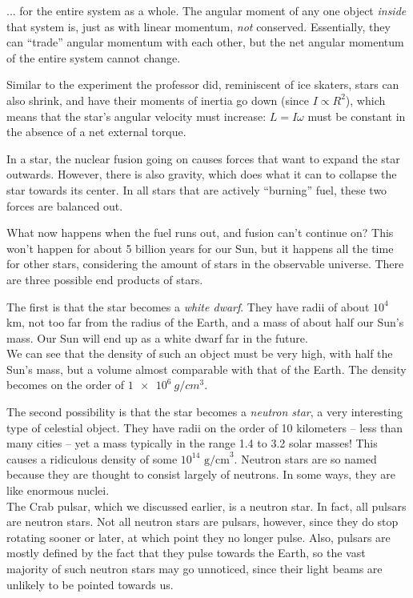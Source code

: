 \documentclass[8.01x]{subfiles}
\begin{document}
... for the entire system as a whole. The angular moment of any one object \emph{inside} that system is, just as with linear momentum, \emph{not} conserved. Essentially, they can ``trade'' angular momentum with each other, but the net angular momentum of the entire system cannot change.

Similar to the experiment the professor did, reminiscent of ice skaters, stars can also shrink, and have their moments of inertia go down (since $I \propto R^2$), which means that the star's angular velocity must increase: $L = I \omega$ must be constant in the absence of a net external torque.

In a star, 	the nuclear fusion going on causes forces that want to expand the star outwards. However, there is also gravity, which does what it can to collapse the star towards its center. In all stars that are actively ``burning'' fuel, these two forces are balanced out.

What now happens when the fuel runs out, and fusion can't continue on? This won't happen for about 5 billion years for our Sun, but it happens all the time for other stars, considering the amount of stars in the observable universe. There are three possible end products of stars.

The first is that the star becomes a \emph{white dwarf}. They have radii of about $10^4$ km, not too far from the radius of the Earth, and a mass of about half our Sun's mass. Our Sun will end up as a white dwarf far in the future.\\
We can see that the density of such an object must be very high, with half the Sun's mass, but a volume almost comparable with that of the Earth. The density becomes on the order of $\SI{1e6}{g/cm^3}$.

The second possibility is that the star becomes a \emph{neutron star}, a very interesting type of celestial object. They have radii on the order of 10 kilometers -- less than many cities -- yet a mass typically in the range 1.4 to 3.2 solar masses! This causes a ridiculous density of some $10^{14} \text{ g/cm}^3$. Neutron stars are so named because they are thought to consist largely of neutrons. In some ways, they are like enormous nuclei.\\
The Crab pulsar, which we discussed earlier, is a neutron star. In fact, all pulsars are neutron stars. Not all neutron stars are pulsars, however, since they do stop rotating sooner or later, at which point they no longer pulse. Also, pulsars are mostly defined by the fact that they pulse towards the Earth, so the vast majority of such neutron stars may go unnoticed, since their light beams are unlikely to be pointed towards us.
\end{document}
